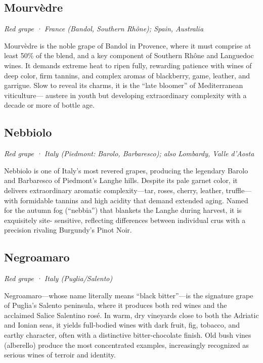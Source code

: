 \subsection*{Mourvèdre}
\textit{Red grape · France (Bandol, Southern Rhône); Spain, Australia}\par\smallskip

Mourvèdre is the noble grape of Bandol in Provence, where it must comprise at least 50\% of the blend, and a key component of Southern Rhône and Languedoc wines. It demands extreme heat to ripen fully, rewarding patience with wines of deep color, firm tannins, and complex aromas of blackberry, game, leather, and garrigue. Slow to reveal its charms, it is the “late bloomer” of Mediterranean viticulture— austere in youth but developing extraordinary complexity with a decade or more of bottle age.

\subsection*{Nebbiolo}
\textit{Red grape · Italy (Piedmont: Barolo, Barbaresco); also Lombardy, Valle d’Aosta}\par\smallskip

Nebbiolo is one of Italy’s most revered grapes, producing the legendary Barolo and Barbaresco of Piedmont’s Langhe hills. Despite its pale garnet color, it delivers extraordinary aromatic complexity—tar, roses, cherry, leather, truffle—with formidable tannins and high acidity that demand extended aging. Named for the autumn fog (“nebbia”) that blankets the Langhe during harvest, it is exquisitely site- sensitive, reflecting differences between individual crus with a precision rivaling Burgundy’s Pinot Noir.

\subsection*{Negroamaro}
\textit{Red grape · Italy (Puglia/Salento)}\par\smallskip

Negroamaro—whose name literally means “black bitter”—is the signature grape of Puglia’s Salento peninsula, where it produces both red wines and the acclaimed Salice Salentino rosé. In warm, dry vineyards close to both the Adriatic and Ionian seas, it yields full-bodied wines with dark fruit, fig, tobacco, and earthy character, often with a distinctive bitter-chocolate finish. Old bush vines (alberello) produce the most concentrated examples, increasingly recognized as serious wines of terroir and identity.

